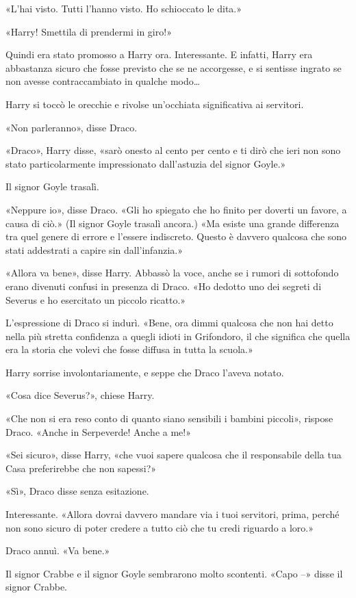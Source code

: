 «L’hai visto. Tutti l’hanno visto. Ho schioccato le dita.»

«Harry! Smettila di prendermi in giro!»

Quindi era stato promosso a Harry ora. Interessante. E infatti, Harry era abbastanza sicuro che fosse previsto che se ne accorgesse, e si sentisse ingrato se non avesse contraccambiato in qualche modo…

Harry si toccò le orecchie e rivolse un’occhiata significativa ai servitori.

«Non parleranno», disse Draco.

«Draco», Harry disse, «sarò onesto al cento per cento e ti dirò che ieri non sono stato particolarmente impressionato dall’astuzia del signor Goyle.»

Il signor Goyle trasalì.

«Neppure io», disse Draco. «Gli ho spiegato che ho finito per doverti un favore, a causa di ciò.» (Il signor Goyle trasalì ancora.) «Ma esiste una grande differenza tra quel genere di errore e l’essere indiscreto. Questo è davvero qualcosa che sono stati addestrati a capire sin dall’infanzia.»

«Allora va bene», disse Harry. Abbassò la voce, anche se i rumori di sottofondo erano divenuti confusi in presenza di Draco. «Ho dedotto uno dei segreti di Severus e ho esercitato un piccolo ricatto.»

L’espressione di Draco si indurì. «Bene, ora dimmi qualcosa che non hai detto nella più stretta confidenza a quegli idioti in Grifondoro, il che significa che quella era la storia che volevi che fosse diffusa in tutta la scuola.»

Harry sorrise involontariamente, e seppe che Draco l’aveva notato.

«Cosa dice Severus?», chiese Harry.

«Che non si era reso conto di quanto siano sensibili i bambini piccoli», rispose Draco. «Anche in Serpeverde! Anche a me!»

«Sei sicuro», disse Harry, «che vuoi sapere qualcosa che il responsabile della tua Casa preferirebbe che non sapessi?»

«Sì», Draco disse senza esitazione.

Interessante. «Allora dovrai davvero mandare via i tuoi servitori, prima, perché non sono sicuro di poter credere a tutto ciò che tu credi riguardo a loro.»

Draco annuì. «Va bene.»

Il signor Crabbe e il signor Goyle sembrarono molto scontenti. «Capo –» disse il signor Crabbe.

